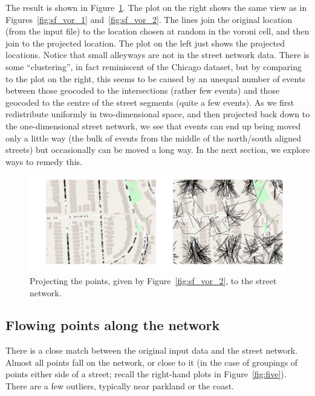 \documentclass[twoside,a4paper,twocolumn,10pt]{article}
\theoremstyle{plain}
\theoremstyle{definition}
\begin{document}
The result is shown in Figure~\ref{fig:sf_net_1}.  The plot on the right shows the same view
as in Figures~\ref{fig:sf_vor_1} and~\ref{fig:sf_vor_2}.  The lines join the original location
(from the input file) to the location chosen at random in the voroni cell, and then
join to the projected location.
The plot on the left just shows the projected locations.  Notice that small alleyways
are not in the street network data.  There is some ``clustering'', in fact reminiscent of
the Chicago dataset, but by comparing to the plot on the right, this seems to be caused
by an unequal number of events between those geocoded to the intersections (rather few events)
and those geocoded to the centre of the street segments (quite a few events).  As we first
redistribute uniformly in two-dimensional space, and then projected back down to the
one-dimensional street network, we see that events can end up being moved only a little way
(the bulk of events from the middle of the north/south aligned streets) but occasionally can
be moved a long way.  In the next section, we explore ways to remedy this.

\begin{figure}
  \includegraphics[width=\textwidth]{san_fran_two_stage_network_projection.png}
  \caption{Projecting the points, given by Figure~\ref{fig:sf_vor_2}, to the street network.}
  \label{fig:sf_net_1}
\end{figure}



\subsection{Flowing points along the network}\label{sec:sf_flow}

There is a close match between the original input data and the street network.  Almost all
points fall on the network, or close to it (in the case of groupings of points either side
of a street; recall the right-hand plots in Figure~\ref{fig:five}).  There are a few outliers,
typically near parkland or the coast.
\end{document}
